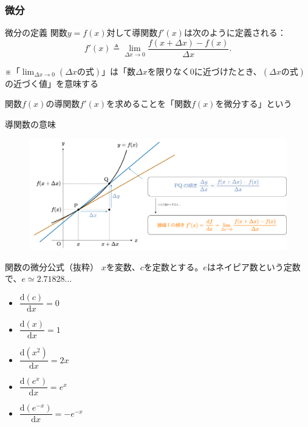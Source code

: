 \documentclass[dvipdfmx,aspectratio=169]{beamer}
\begin{document}
	\subsubsection{微分}
	\begin{frame}{微分の定義}
		関数$ y=f(x) $対して\alert{導関数}$ f'(x) $は次のように定義される：
		\begin{equation*}
			f'(x) \triangleq \lim_{\Delta x \to 0} \dfrac{f(x + \Delta x) - f(x)}{\Delta x}.
		\end{equation*}
	
		※「$ \displaystyle\lim_{\Delta x \to 0} (\Delta x \text{の式}) $」は「数$ \Delta x $を限りなく$ 0 $に近づけたとき、$ (\Delta x \text{の式}) $の近づく値」を意味する
		
		関数$ f(x) $の導関数$ f'(x) $を求めることを「関数$ f(x) $を\alert{微分する}」という
	\end{frame}
	\begin{frame}{導関数の意味}
		\begin{figure}
			\centering
			\includegraphics[width=1.0\linewidth]{img/meening-of-derivative}
		\end{figure}
	\end{frame}
	\begin{frame}{関数の微分公式（抜粋）}
		$ x $を変数、$ c $を定数とする。$ e $は\alert{ネイピア数}という定数で、$ e \simeq 2.71828\dots $
		\begin{itemize}
			\item $ \dfrac{\mathrm{d}(c)}{\mathrm{d}x} = 0 $
			\item $ \dfrac{\mathrm{d}(x)}{\mathrm{d}x} = 1 $
			\item $ \dfrac{\mathrm{d}(x^2)}{\mathrm{d}x} = 2x $
			\item $ \dfrac{\mathrm{d}(e^x)}{\mathrm{d}x} = e^x $
			\item $ \dfrac{\mathrm{d}(e^{-x})}{\mathrm{d}x} = -e^{-x} $
		\end{itemize}
	\end{frame}
\end{document}
